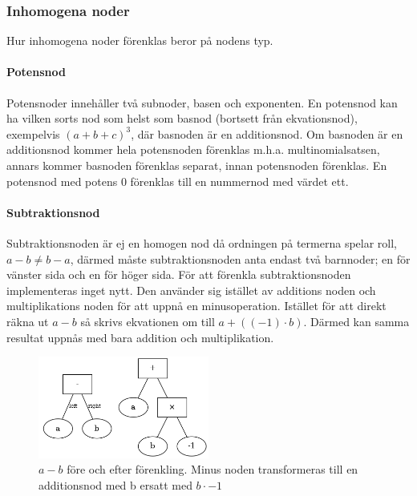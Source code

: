 \documentclass[12pt,a4paper]{article}
\begin{document}
\subsubsection{Inhomogena noder}
Hur inhomogena noder förenklas beror på nodens typ.
\paragraph{Potensnod}
\label{subsubsec:potensnod}
Potensnoder innehåller två subnoder, basen och exponenten. En potensnod kan ha vilken sorts nod som helst som basnod (bortsett från ekvationsnod), exempelvis \((a+b+c)^{3}\), där basnoden är en additionsnod. Om basnoden är en additionsnod kommer hela potensnoden förenklas m.h.a. multinomialsatsen, annars kommer basnoden förenklas separat, innan potensnoden förenklas. En potensnod med potens 0 förenklas till en nummernod med värdet ett. 
\paragraph{Subtraktionsnod}
Subtraktionsnoden är ej en homogen nod då ordningen på termerna spelar roll, \(a-b\neq b-a\), därmed måste subtraktionsnoden anta endast två barnnoder; en för vänster sida och en för höger sida. För att förenkla subtraktionsnoden implementeras inget nytt. Den använder sig istället av additions noden och multiplikations noden för att uppnå en minusoperation. Istället för att direkt räkna ut \(a-b\) så skrivs ekvationen om till \(a+((-1)\cdot b)\). Därmed kan samma resultat uppnås med bara addition och multiplikation.
\begin{figure}[h!]
  \centering
  \includegraphics[width=0.5\textwidth]{image-merged3.png}
  \caption{\(a-b\) före och efter förenkling. Minus noden transformeras till en additionsnod med b ersatt med \(b \cdot -1\)}
\end{figure}
\end{document}
